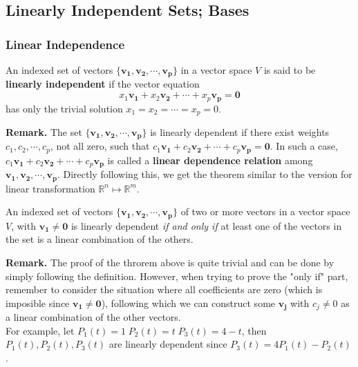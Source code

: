 \documentclass[10pt, a4paper]{article}
\newcommand{\R}{\mathbb{R}}
\begin{document}
\subsection{Linearly Independent Sets; Bases}
\subsubsection*{Linear Independence}
\begin{definition}
    An indexed set of vectors $\{\mathbf{v_1}, \mathbf{v_2}, \cdots, \mathbf{v_p}\}$ in a vector space $V$ is said to be \textbf{linearly independent} if the vector equation \[
    x_1\mathbf{v_1} + x_2\mathbf{v_2} + \cdots + x_p\mathbf{v_p} = \mathbf{0}
    \] has only the trivial solution $x_1 = x_2 = \cdots = x_p = 0$. 
\end{definition}
\indent\textbf{Remark.} The set $\{\mathbf{v_1}, \mathbf{v_2}, \cdots, \mathbf{v_p}\}$ is linearly dependent if there exist weights $c_1, c_2, \cdots, c_p$, not all zero, such that $c_1\mathbf{v_1} + c_2\mathbf{v_2} + \cdots + c_p\mathbf{v_p} = \mathbf{0}$. 
In such a case, $c_1\mathbf{v_1} + c_2\mathbf{v_2} + \cdots + c_p\mathbf{v_p}$ is called a \textbf{linear dependence relation} among $\mathbf{v_1}, \mathbf{v_2}, \cdots, \mathbf{v_p}$. Directly following this, we get the theorem similar to the version for linear transformation $\R^n\mapsto\R^m$.
\begin{proposition}
    An indexed set of vectors $\{\mathbf{v_1}, \mathbf{v_2}, \cdots, \mathbf{v_p}\}$ of two or more vectors in a vector space $V$, with $\mathbf{v_1}\neq \mathbf{0}$ is linearly dependent \textit{if and only if} at least one of the vectors in the set is a linear combination of the others.
\end{proposition}
\indent\textbf{Remark.} The proof of the throrem above is quite trivial and can be done by simply following the definition. However, when trying to prove the "only if" part, remember to consider the situation where all coefficients are zero (which is imposible since $\mathbf{v_1}\neq \mathbf{0}$), following which we can construct some $\mathbf{v_j}$ with $c_j\neq0$ as a linear combination of the other vectors.\\
\indent For example, let $P_1(t)=1\; P_2(t)=t\; P_3(t)=4-t$, then $P_1(t), P_2(t), P_3(t)$ are linearly dependent since $P_3(t) = 4P_1(t) - P_2(t)$.
\end{document}
